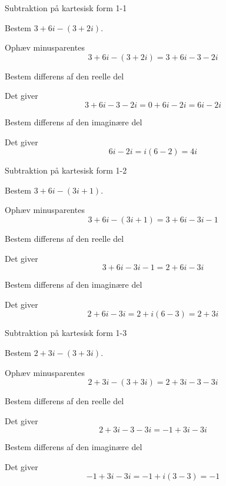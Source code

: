 \documentclass{article}
\begin{document}
\tableofcontents
\newpage

\begin{exercise}{Subtraktion på kartesisk form 1-1}

Bestem $3+6i-(3+2i)$.


\hint

Ophæv minusparentes
\[
3+6i-(3+2i) = 3+6i -3-2i
\]

\hint

Bestem differens af den reelle del

\hint

Det giver
\[
3+6i -3-2i = 0 + 6i -2i = 6i -2i
\]

\hint

Bestem differens af den imaginære del 


\hint

Det giver 
\[
 6i -2i = i(6-2) = 4i
\]

\end{exercise}

\newpage

\begin{exercise}{Subtraktion på kartesisk form 1-2}
	
	Bestem $3+6i-(3i+1)$.
	
	
	\hint
	
	Ophæv minusparentes
	\[
	3+6i-(3i+1) = 3 + 6i -3i -1
	\]
	
	\hint
	
	Bestem differens af den reelle del
	
	\hint
	
	Det giver
	\[
	3 + 6i -3i -1 = 2 + 6i -3i
	\]
	
	\hint
	
	Bestem differens af den imaginære del 
	
	
	\hint
	
	Det giver 
	\[
	2 + 6i -3i = 2+ i(6-3) = 2 + 3i
	\]
	
\end{exercise}

\newpage

\begin{exercise}{Subtraktion på kartesisk form 1-3}
	
	Bestem $2+3i-(3+3i)$.
	
	
	\hint
	
	Ophæv minusparentes
	\[
	2+3i-(3+3i)  = 	2+ 3i -3 -3i
	\]
	
	\hint
	
	Bestem differens af den reelle del
	
	\hint
	
	Det giver
	\[
	2+ 3i -3 -3i  = -1 +3i-3i	
	\]
	
	\hint
	
	Bestem differens af den imaginære del 
	
	
	\hint
	
	Det giver 
	\[
	-1 +3i-3i  = -1 + i(3-3) = -1
	\]
	
\end{exercise}
\end{document}
